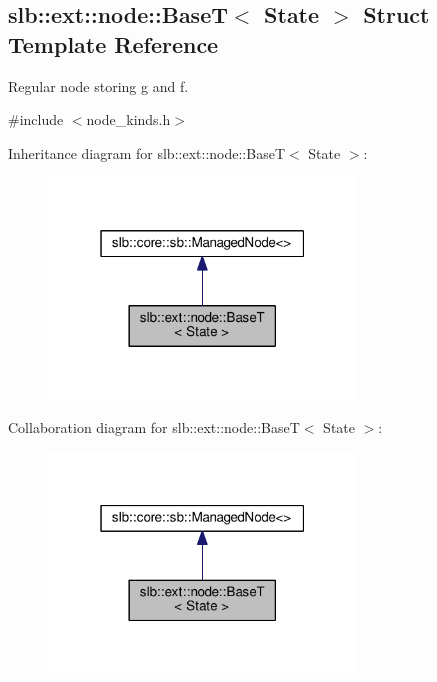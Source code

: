 \hypertarget{structslb_1_1ext_1_1node_1_1BaseT}{}\subsection{slb\+:\+:ext\+:\+:node\+:\+:BaseT$<$ State $>$ Struct Template Reference}
\label{structslb_1_1ext_1_1node_1_1BaseT}


Regular node storing {\ttfamily g} and {\ttfamily f}.  




{\ttfamily \#include $<$node\+\_\+kinds.\+h$>$}



Inheritance diagram for slb\+:\+:ext\+:\+:node\+:\+:BaseT$<$ State $>$\+:\nopagebreak
\begin{figure}[H]
\begin{center}
\leavevmode
\includegraphics[width=232pt]{structslb_1_1ext_1_1node_1_1BaseT__inherit__graph}
\end{center}
\end{figure}


Collaboration diagram for slb\+:\+:ext\+:\+:node\+:\+:BaseT$<$ State $>$\+:\nopagebreak
\begin{figure}[H]
\begin{center}
\leavevmode
\includegraphics[width=232pt]{structslb_1_1ext_1_1node_1_1BaseT__coll__graph}
\end{center}
\end{figure}
